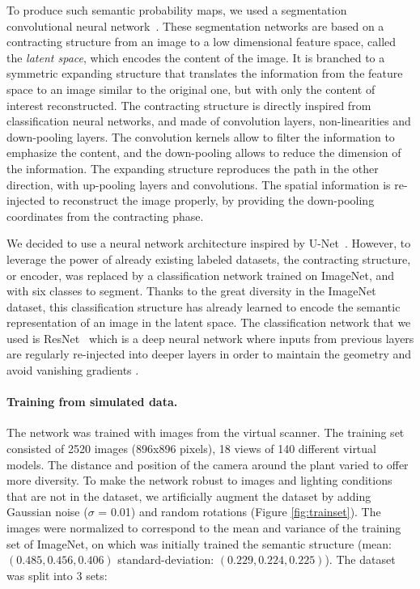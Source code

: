 To produce such semantic probability maps, we used a segmentation
convolutional neural network~\cite{guo_review_2018}. These segmentation networks
are based on a contracting structure from an image to a low dimensional
feature space, called the \emph{latent space}, which encodes the content of the image. It is branched
to a symmetric expanding structure that translates the information from
the feature space to an image similar to the original one, but with
only the content of interest reconstructed. The contracting structure
is directly inspired from classification neural networks, and made
of convolution layers, non-linearities and down-pooling layers. The
convolution kernels allow to filter the information to emphasize
the content, and the down-pooling allows to reduce the dimension
of the information. The expanding structure reproduces the path in
the other direction, with up-pooling layers and convolutions. The
spatial information is re-injected to reconstruct the image properly,
by providing the down-pooling coordinates from the contracting phase.


We decided to use a neural network architecture inspired by U-Net~\cite{ronneberger_u-net:_2015}. However, to leverage the power of
already existing labeled datasets, the contracting
structure, or encoder, was replaced by a classification network trained
on ImageNet, and with six classes to segment. Thanks to the great diversity
in the ImageNet dataset, this classification
structure has already learned to encode the semantic
representation of an image in the latent space. The classification network that we used is
ResNet~\cite{he_deep_2015} which is a deep neural network where inputs
from previous layers are regularly re-injected into deeper layers
in order to maintain the geometry and avoid vanishing gradients
\cite{hochreiter_vanishing_1998}.

\paragraph{Training from simulated data.} The network was trained with
images from the virtual scanner. The training set consisted of 2520 images (896x896 pixels), 18 views of 140 different virtual models. The distance and position of the camera around the plant varied to offer more diversity. To make the network robust to images and lighting conditions that are not in the dataset, we artificially augment the dataset by adding Gaussian noise ($\sigma$ = 0.01) and random rotations (Figure \ref{fig:trainset}). The images were normalized to correspond to the mean and variance of the training set of ImageNet, on which was initially trained the semantic structure (mean: $(0.485, 0.456, 0.406)$ standard-deviation: $(0.229, 0.224, 0.225)$). 
The dataset was split into 3 sets:

